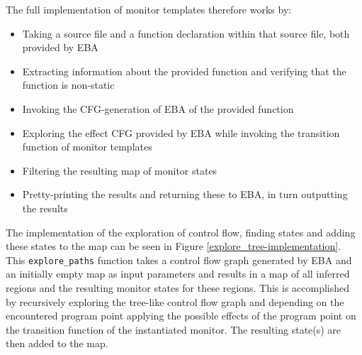 \newpar The full implementation of monitor templates therefore works by:

\begin{itemize}
    \item Taking a source file and a function declaration within that source file, both provided by EBA
    \item Extracting information about the provided function and verifying that the function is non-static
    \item Invoking the CFG-generation of EBA of the provided function
    \item Exploring the effect CFG provided by EBA while invoking the transition function of monitor templates
    \item Filtering the resulting map of monitor states
    \item Pretty-printing the results and returning these to EBA, in turn outputting the results 
\end{itemize}

\newpar The implementation of the exploration of control flow, finding states and adding these states to the map can be seen in Figure \ref{explore_tree-implementation}. This \texttt{explore\_paths} function takes a control flow graph generated by EBA and an initially empty map as input parameters and results in a map of all inferred regions and the resulting monitor states for these regions. This is accomplished by recursively exploring the tree-like control flow graph and depending on the encountered program point applying the possible effects of the program point on the transition function of the instantiated monitor. The resulting state(s) are then added to the map. 

